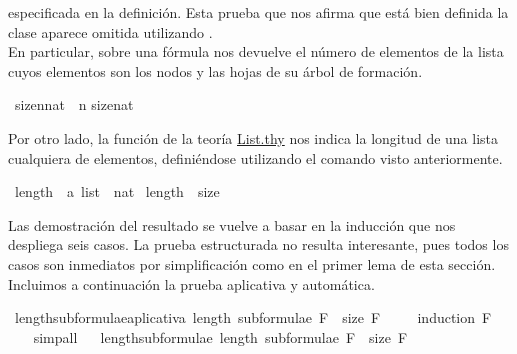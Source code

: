 \begin{isabellebody}
\begin{isamarkuptext}
especificada en la definición. Esta prueba que nos afirma que está bien definida la clase aparece
omitida utilizando \isa{{\isachardot}{\isachardot}} .
\\
En particular,
sobre una fórmula nos devuelve el número de elementos de la lista cuyos elementos son los nodos
y las hojas de su árbol de formación.%
\end{isamarkuptext}\isamarkuptrue%
\isamarkupfalse%
\ {\isachardoublequoteopen}size{\isacharparenleft}n{\isacharcolon}{\isacharcolon}nat{\isacharparenright}\ {\isacharequal}\ n{\isachardoublequoteclose}\isanewline
{}\isamarkupfalse%
{\isachardoublequoteopen}size{\isacharparenleft}{}{\isacharcolon}{\isacharcolon}nat{\isacharparenright}\ {\isacharequal}\ {}{\isachardoublequoteclose}%
\begin{isamarkuptext}%
Por otro lado, la función  de la teoría \href{http://cort.as/-Stfm}{List.thy}
nos indica la longitud de una lista cualquiera de elementos, definiéndose utilizando el comando
 visto anteriormente.%
\end{isamarkuptext}\isamarkuptrue%
\isamarkupfalse%
\ length\ {\isacharcolon}{\isacharcolon}\ {\isachardoublequoteopen}{\isacharprime}a\ list\ {\isasymRightarrow}\ nat{\isachardoublequoteclose}\ \isanewline
{\isachardoublequoteopen}length\ {\isasymequiv}\ size{\isachardoublequoteclose}%
\begin{isamarkuptext}%
Las demostración del resultado se vuelve a basar en la inducción que nos despliega seis casos. 
La prueba estructurada no resulta interesante, pues todos los casos son
inmediatos por simplificación como en el primer lema de esta sección. 
Incluimos a continuación la prueba aplicativa y 
automática.%
\end{isamarkuptext}\isamarkuptrue%
\isamarkupfalse%
\ length{\isacharunderscore}subformulae{\isacharunderscore}aplicativa{\isacharcolon}\ {\isachardoublequoteopen}length\ {\isacharparenleft}subformulae\ F{\isacharparenright}\ {\isacharequal}\ size\ F{\isachardoublequoteclose}\ \isanewline
%
\isadelimproof
\ \ %
\endisadelimproof
%
\isatagproof
{}\isamarkupfalse%
\ {\isacharparenleft}induction\ F{\isacharparenright}\ \isanewline
\ \ \isamarkupfalse%
\ simp{\isacharunderscore}all\isanewline
\ \isamarkupfalse%
%
\endisatagproof
{\isafoldproof}%
%
\isadelimproof
\isanewline
%
\endisadelimproof
\isanewline
{}\isamarkupfalse%
\ length{\isacharunderscore}subformulae{\isacharcolon}\ {\isachardoublequoteopen}length\ {\isacharparenleft}subformulae\ F{\isacharparenright}\ {\isacharequal}\ size\ F{\isachardoublequoteclose}\ \isanewline

\end{isabellebody}
